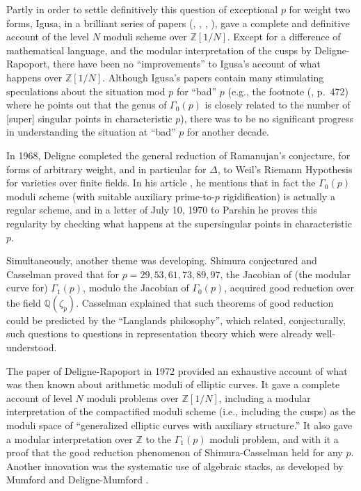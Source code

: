 Partly in order to settle definitively this question of exceptional $p$ for weight two forms, Igusa, in a brilliant series of papers (\cite{Ig2}, \cite{Ig3}, \cite{Ig4}, \cite{Ig5}), gave a complete and definitive account of the level $N$ moduli scheme over $\mathbb{Z}[1/N]$. Except for a difference of mathematical language, and the modular interpretation of the cusps by Deligne-Rapoport, there have been no ``improvements'' to Igusa's account of what happens over $\mathbb{Z}[1/N]$. Although Igusa's papers contain many stimulating speculations about the situation mod $p$ for ``bad'' $p$ (e.g., the footnote (\cite{Ig2}, p.~472) where he points out that the genus of $\Gamma_0(p)$ is closely related to the number of [super] singular points in characteristic $p$), there was to be no significant progress in understanding the situation at ``bad'' $p$ for another decade.

In 1968, Deligne completed the general reduction of Ramanujan's conjecture, for forms of arbitrary weight, and in particular for $\Delta$, to Weil's Riemann Hypothesis for varieties over finite fields. In his article \cite{De1}, he mentions that in fact the $\Gamma_0(p)$ moduli scheme (with suitable auxiliary prime-to-$p$ rigidification) is actually a regular scheme, and in a letter of July 10, 1970 to Parshin he proves this regularity by checking what happens at the supersingular points in characteristic $p$.

Simultaneously, another theme was developing. Shimura conjectured and Casselman \cite{Cmn1} proved that for $p = 29, 53, 61, 73, 89, 97$, the Jacobian of (the modular curve for) $\Gamma_1(p)$, modulo the Jacobian of $\Gamma_0(p)$, acquired good reduction over the field $\mathbb{Q}(\zeta_p)$. Casselman \cite{Cmn2} explained that such theorems of good reduction could be predicted by the ``Langlands philosophy'', which related, conjecturally, such questions to questions in representation theory which were already well-understood.

The paper of Deligne-Rapoport \cite{DeRa} in 1972 provided an exhaustive account of what was then known about arithmetic moduli of elliptic curves. It gave a complete account of level $N$ moduli problems over $\mathbb{Z}[1/N]$, including a modular interpretation of the compactified moduli scheme (i.e., including the cusps) as the moduli space of ``generalized elliptic curves with auxiliary structure.'' It also gave a modular interpretation over $\mathbb{Z}$ to the $\Gamma_1(p)$ moduli problem, and with it a proof that the good reduction phenomenon of Shimura-Casselman held for any $p$. Another innovation was the systematic use of algebraic stacks, as developed by Mumford \cite{Mum1} and Deligne-Mumford \cite{DeMu}.

